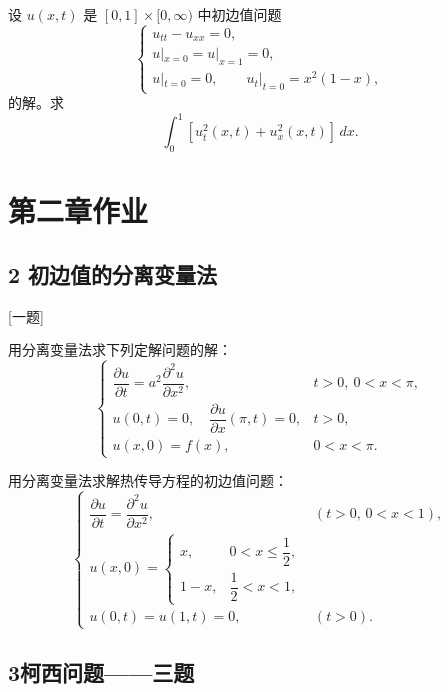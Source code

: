\begin{homework}[7]
设 $u(x,t)$ 是 $[0,1]\times[0,\infty)$ 中初边值问题
\[
\begin{cases}
u_{tt}-u_{xx}=0,\\[4pt]
u|_{x=0}=u|_{x=1}=0,\\[4pt]
u|_{t=0}=0,\qquad u_t|_{t=0}=x^{2}(1-x),
\end{cases}
\]
的解。求
\[
\int_{0}^{1}\left[u_t^{2}(x,t)+u_x^{2}(x,t)\right]\,dx.
\]
\end{homework}
\chapter{第二章作业}
\section{2 初边值的分离变量法}[一题]
\begin{homework}[1]
用分离变量法求下列定解问题的解：
\[
\begin{cases}
\dfrac{\partial u}{\partial t}
= a^{2}\dfrac{\partial^{2}u}{\partial x^{2}},
& t>0,\ 0<x<\pi,\\[6pt]
u(0,t)=0,\quad
\dfrac{\partial u}{\partial x}(\pi,t)=0,
& t>0,\\[6pt]
u(x,0)=f(x),
& 0<x<\pi.
\end{cases}
\]
\end{homework}
\begin{homework}[2]
用分离变量法求解热传导方程的初边值问题：
\[
\begin{cases}
\dfrac{\partial u}{\partial t}
= \dfrac{\partial^2 u}{\partial x^2}, & (t>0,\,0<x<1),\\[6pt]
u(x,0)=
\begin{cases}
x, & 0<x\le\dfrac{1}{2},\\[4pt]
1-x, & \dfrac{1}{2}<x<1,
\end{cases}\\[10pt]
u(0,t)=u(1,t)=0, & (t>0).
\end{cases}
\]
\end{homework}


\section{3柯西问题——三题}

